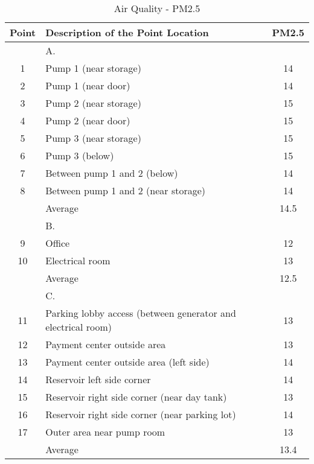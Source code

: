 \begin{table}
	\caption{Air Quality - PM2.5}
	\label{ch047_tbl_pm}
	{\footnotesize

\begin{tabular}{c|l|c}
\hline
Point & Description of the Point Location & PM2.5 \\ 
\hline
 & A. &  \\ 
1 & Pump 1  (near storage) & 14 \\ 
2 & Pump 1  (near door) & 14 \\ 
3 & Pump 2 (near storage) & 15 \\ 
4 & Pump 2  (near door) & 15 \\ 
5 & Pump 3  (near storage) & 15 \\ 
6 & Pump 3 (below) & 15 \\ 
7 & Between pump 1 and 2 (below) & 14 \\ 
8 & Between pump 1 and 2 (near storage) & 14 \\ 
 & Average & 14.5 \\ 
\hline
 & B. &  \\ 
9 & Office & 12 \\ 
10 & Electrical room & 13 \\ 
 & Average & 12.5 \\ 
\hline
 & C. &  \\ 
11 & Parking lobby access (between generator and electrical room) & 13 \\ 
12 & Payment center outside area & 13 \\ 
13 & Payment center outside area (left side) & 14 \\ 
14 & Reservoir left side corner & 14 \\ 
15 & Reservoir right side corner (near day tank) & 13 \\ 
16 & Reservoir right side corner (near parking lot) & 14 \\ 
17 & Outer area near pump room & 13 \\ 
 & Average & 13.4 \\ 
\hline
\end{tabular}
}
\end{table}